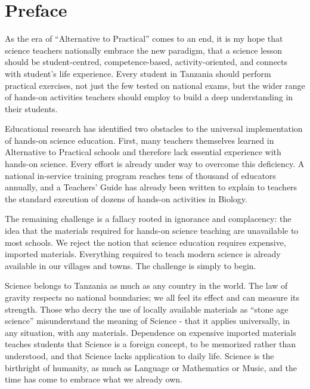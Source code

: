\chapter*{Preface}

As the era of ``Alternative to Practical'' comes to an end, it is my hope that science teachers nationally embrace the new paradigm, that a science lesson should be student-centred, competence-based, activity-oriented, and connects with student's life experience. Every student in Tanzania should perform practical exercises, not just the few tested on national exams, but the wider range of hands-on activities teachers should employ to build a deep understanding in their students.

Educational research has identified two obstacles to the universal implementation of hands-on science education. First, many teachers themselves learned in Alternative to Practical schools and therefore lack essential experience with hands-on science. Every effort is already under way to overcome this deficiency. A national in-service training program reaches tens of thousand of educators annually, and a Teachers' Guide has already been written to explain to teachers the standard execution of dozens of hands-on activities in Biology.

The remaining challenge is a fallacy rooted in ignorance and complacency: the idea that the materials required for hands-on science teaching are unavailable to most schools. We reject the notion that science education requires expensive, imported materials. Everything required to teach modern science is already available in our villages and towns. The challenge is simply to begin.

Science belongs to Tanzania as much as any country in the world. The law of gravity respects no national boundaries; we all feel its effect and can measure its strength. Those who decry the use of locally available materials as ``stone age science'' misunderstand the meaning 
of Science - that it applies universally, in any situation, with any materials. Dependence on expensive imported materials teaches students that Science is a foreign concept, to be memorized rather than understood, and that Science lacks application to daily life. Science is the birthright of humanity, as much as Language or Mathematics or Music, and the time has come to embrace what we already own.

